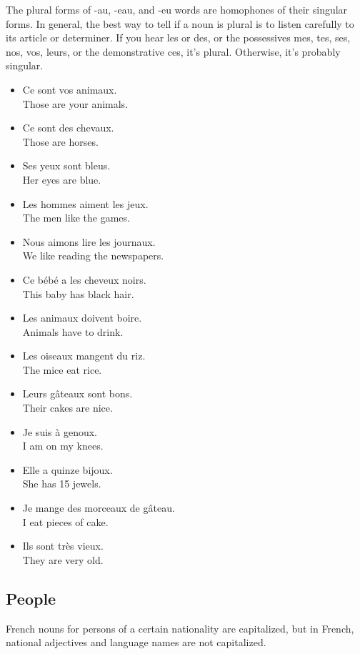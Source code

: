 The plural forms of -au, -eau, and -eu words are homophones of their singular forms. In general, the best way to tell if a noun is plural is to listen carefully to its article or determiner. If you hear les or des, or the possessives mes, tes, ses, nos, vos, leurs, or the demonstrative ces, it's plural. Otherwise, it's probably singular.

\begin{itemize}
  \item  Ce sont vos animaux. \\ Those are your animals.
  \item  Ce sont des chevaux. \\ Those are horses.
	\item  Ses yeux sont bleus. \\ Her eyes are blue.
	\item  Les hommes aiment les jeux. \\ The men like the games.
	\item  Nous aimons lire les journaux. \\ We like reading the newspapers.
	\item  Ce b{\'e}b{\'e} a les cheveux noirs. \\ This baby has black hair.
	\item  Les animaux doivent boire. \\ Animals have to drink.
	\item  Les oiseaux mangent du riz. \\ The mice eat rice.
	\item  Leurs g{\^a}teaux sont bons. \\ Their cakes are nice.
	\item  Je suis {\`a} genoux. \\ I am on my knees.
	\item  Elle a quinze bijoux. \\ She has 15 jewels.
	\item  Je mange des morceaux de g{\^a}teau. \\ I eat pieces of cake.
	\item  Ils sont tr{\`e}s vieux. \\ They are very old.
\end{itemize}


\pagebreak
\subsection{People}

French nouns for persons of a certain nationality are capitalized, but in French, national adjectives and language names are not capitalized.

